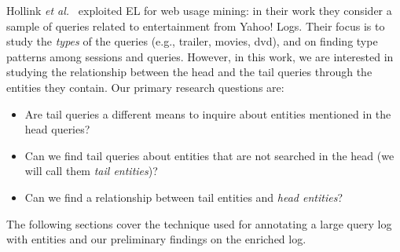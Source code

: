 

Hollink \emph{et al.}~\cite{hollink2013web} exploited EL for web usage mining: 
in their work they consider a sample of queries related to entertainment from 
Yahoo! Logs. Their focus is to study the \emph{types} of the queries (e.g., trailer, movies, dvd), and on finding
type patterns among sessions and queries. However, in this work, we are interested in studying the 
relationship between the head and the tail queries through the entities they contain. 
Our primary research questions are:
\begin{itemize}
	\item Are tail queries a different means to inquire about entities mentioned in the head queries? 
	\item Can we find tail queries about entities that are not searched in the head (we will call them \emph{tail entities})?
	\item Can we find a relationship between tail entities and \emph{head entities}?  
\end{itemize} 

The following sections cover the technique used for annotating a large query log with entities and our 
preliminary findings on the enriched log.


 
